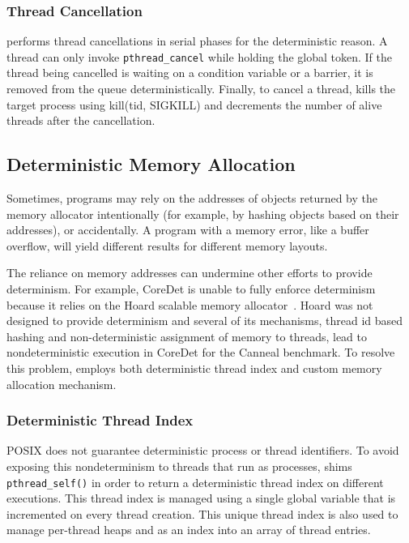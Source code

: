 \subsubsection{Thread Cancellation}

\dthreads{} performs thread cancellations in serial phases for the deterministic reason. A thread can only invoke \texttt{pthread\_cancel} while holding the global token. If the thread being cancelled is waiting on a condition variable or a barrier, it is removed from the queue deterministically. Finally, to cancel a thread, \dthreads{} kills the target process using kill(tid, SIGKILL) and decrements the number of alive threads after the cancellation.

\subsection{Deterministic Memory Allocation}
Sometimes, programs may rely on the addresses of objects returned by the memory allocator intentionally (for example, by hashing objects based on their addresses), or accidentally. A program with a memory error, like a buffer overflow, will yield different results for different memory layouts.

The reliance on memory addresses can undermine other efforts to provide determinism. For example, CoreDet is unable to fully enforce determinism because it relies on the Hoard scalable memory allocator~\cite{Bergan:2010:CCR:1736020.1736029}. Hoard was not designed to provide determinism and several of its mechanisms, thread id based hashing and non-deterministic assignment of memory to threads, lead to nondeterministic execution in CoreDet for the Canneal benchmark. To resolve this problem, \dthreads{} employs both deterministic thread index and custom memory allocation mechanism. 

\subsubsection{Deterministic Thread Index}
\label{sec:threadindex}

POSIX does not guarantee deterministic process or thread identifiers. To avoid exposing this nondeterminism to threads that run as processes, \dthreads{} shims \texttt{pthread\_self()} in order to return a deterministic thread index on different executions. This thread index is managed using a single global variable that is incremented on every thread creation.  This unique thread index is also used to manage per-thread heaps and as an index into an array of thread entries.


